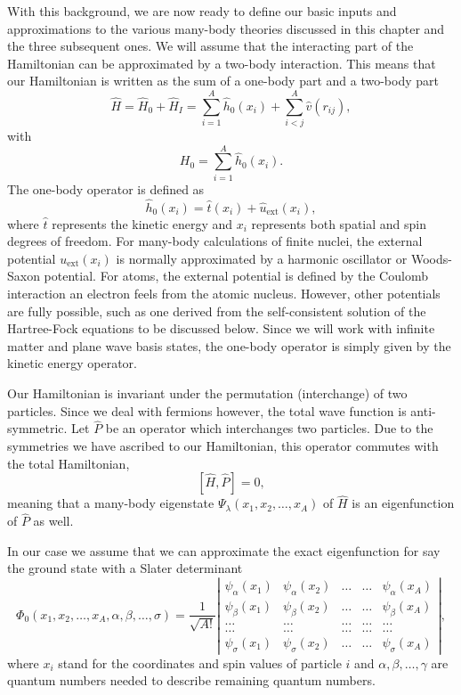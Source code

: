 With this background, we are now ready to define our basic inputs and
approximations to the various many-body theories discussed in this
chapter and the three subsequent ones.  We will assume that the
interacting part of the Hamiltonian can be approximated by a two-body
interaction.  This means that our Hamiltonian is written as the sum of
a one-body part and a two-body part
\begin{equation}
    \hat{H} = \hat{H}_0 + \hat{H}_I = \sum_{i=1}^A \hat{h}_0(x_i) +
    \sum_{i < j}^A \hat{v}(r_{ij}),
\label{Hnuclei}
\end{equation}
with
\begin{equation}
  H_0=\sum_{i=1}^A \hat{h}_0(x_i).
\label{hinuclei}
\end{equation}
The one-body operator is defined as
\[
\hat{h}_0(x_i)=\hat{t}(x_i) + \hat{u}_{\mathrm{ext}}(x_i),
\]
where $\hat{t}$ represents the kinetic energy and $x_i$ represents
both spatial and spin degrees of freedom.  For many-body calculations
of finite nuclei, the external potential $u_{\mathrm{ext}}(x_i)$ is
normally approximated by a harmonic oscillator or Woods-Saxon
potential. For atoms, the external potential is defined by the Coulomb
interaction an electron feels from the atomic nucleus. However, other
potentials are fully possible, such as one derived from the
self-consistent solution of the Hartree-Fock equations to be discussed
below. Since we will work with infinite matter and plane wave basis states, the one-body operator is
simply given by the kinetic energy operator.

Our Hamiltonian is invariant under the permutation (interchange) of
two particles.  Since we deal with fermions however, the total wave
function is anti-symmetric.  Let $\hat{P}$ be an operator which
interchanges two particles.  Due to the symmetries we have ascribed to
our Hamiltonian, this operator commutes with the total Hamiltonian,
\[
[\hat{H},\hat{P}] = 0,
 \]
meaning that a many-body eigenstate $\Psi_{\lambda}(x_1, x_2, \dots ,
x_A)$ of $\hat{H}$ is an eigenfunction of $\hat{P}$ as well.

In our case we assume that we can approximate the exact eigenfunction
for say the ground state with a Slater determinant
\begin{equation}
   \Phi_0(x_1, x_2,\dots ,x_A,\alpha,\beta,\dots,
   \sigma)=\frac{1}{\sqrt{A!}}  \left| \begin{array}{ccccc}
     \psi_{\alpha}(x_1)& \psi_{\alpha}(x_2)& \dots & \dots &
     \psi_{\alpha}(x_A)\\ \psi_{\beta}(x_1)&\psi_{\beta}(x_2)& \dots &
     \dots & \psi_{\beta}(x_A)\\ \dots & \dots & \dots & \dots & \dots
     \\ \dots & \dots & \dots & \dots & \dots
     \\ \psi_{\sigma}(x_1)&\psi_{\sigma}(x_2)& \dots & \dots &
     \psi_{\sigma}(x_A)\end{array} \right|, \label{eq:HartreeFockDet}
\end{equation}
where $x_i$ stand for the coordinates and spin values of particle
$i$ and $\alpha,\beta,\dots, \gamma$ are quantum numbers needed to
describe remaining quantum numbers.

